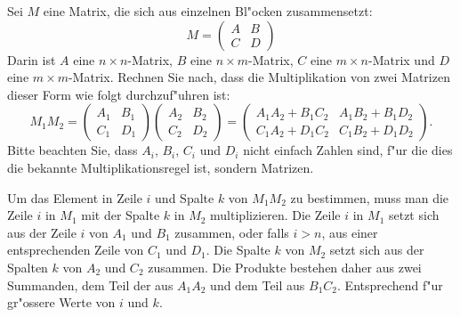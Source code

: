 Sei $M$ eine Matrix, die sich aus einzelnen Bl"ocken zusammensetzt:
\[
M
=
\begin{pmatrix}
A&B\\
C&D
\end{pmatrix}
\]
Darin ist $A$ eine $n\times n$-Matrix, $B$ eine $n\times m$-Matrix,
$C$ eine $m\times n$-Matrix und $D$ eine $m\times m$-Matrix. Rechnen
Sie nach, dass die Multiplikation von zwei Matrizen dieser Form
wie folgt durchzuf"uhren ist:
\[
M_1M_2=
\begin{pmatrix}
A_1&B_1\\
C_1&D_1
\end{pmatrix}
\begin{pmatrix}
A_2&B_2\\
C_2&D_2
\end{pmatrix}
=\begin{pmatrix}
A_1A_2+B_1C_2&A_1B_2+B_1D_2\\
C_1A_2+D_1C_2&C_1B_2+D_1D_2
\end{pmatrix}.
\]
Bitte beachten Sie, dass $A_i$, $B_i$, $C_i$ und $D_i$  nicht einfach
Zahlen sind, f"ur die dies die bekannte Multiplikationsregel ist,
sondern Matrizen.

\begin{loesung}
Um das Element in Zeile $i$ und Spalte $k$ von $M_1M_2$ zu bestimmen,
muss man die Zeile $i$ in $M_1$ mit der Spalte $k$ in $M_2$ multiplizieren.
Die Zeile $i$ in $M_1$ setzt sich aus der Zeile $i$ von $A_1$ und $B_1$
zusammen, oder falls $i > n$, aus einer entsprechenden Zeile von
$C_1$ und $D_1$.
Die Spalte $k$ von $M_2$ setzt sich aus der Spalten $k$ von
$A_2$ und $C_2$ zusammen.
Die Produkte bestehen daher aus zwei Summanden, dem Teil
der aus $A_1A_2$
und dem Teil aus $B_1C_2$. Entsprechend f"ur gr"ossere Werte von $i$
und $k$.
\end{loesung}

